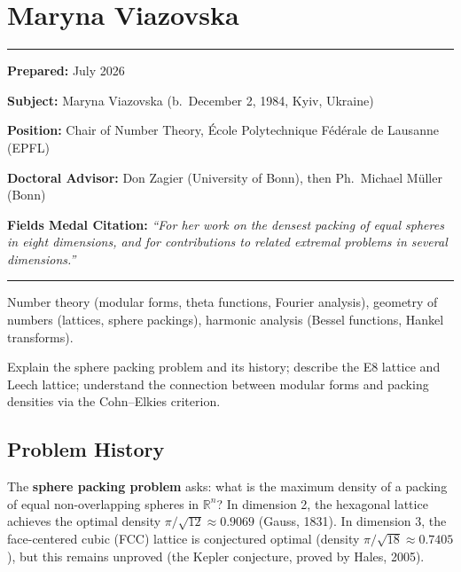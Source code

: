 \chapter{Maryna Viazovska}\label{ch2022marynaviazovska:maryna-viazovska-fields-medal-2022-a-comprehensive-report-on-her-work-and-impact}

\begin{center}\rule{0.5\linewidth}{0.5pt}\end{center}

\textbf{Prepared:} July 2026

\textbf{Subject:} Maryna Viazovska (b.\ December 2, 1984, Kyiv, Ukraine)

\textbf{Position:} Chair of Number Theory, \'{E}cole Polytechnique F\'ed\'erale de Lausanne (EPFL)

\textbf{Doctoral Advisor:} Don Zagier (University of Bonn), then Ph.\ Michael M\"uller (Bonn)

\textbf{Fields Medal Citation:} \emph{``For her work on the densest packing of equal spheres in eight dimensions, and for contributions to related extremal problems in several dimensions.''}

\begin{center}\rule{0.5\linewidth}{0.5pt}\end{center}

\begin{prereqs}
Number theory (modular forms, theta functions, Fourier analysis), geometry of numbers (lattices, sphere packings), harmonic analysis (Bessel functions, Hankel transforms).
\end{prereqs}

\begin{objectives}
Explain the sphere packing problem and its history; describe the E8 lattice and Leech lattice; understand the connection between modular forms and packing densities via the Cohn--Elkies criterion.
\end{objectives}

\section{Problem History}

The \textbf{sphere packing problem} asks: what is the maximum density of a packing of equal non-overlapping spheres in $\mathbb{R}^n$? In dimension 2, the hexagonal lattice achieves the optimal density $\pi/\sqrt{12} \approx 0.9069$ (Gauss, 1831). In dimension 3, the face-centered cubic (FCC) lattice is conjectured optimal (density $\pi/\sqrt{18} \approx 0.7405$), but this remains unproved (the Kepler conjecture, proved by Hales, 2005).

